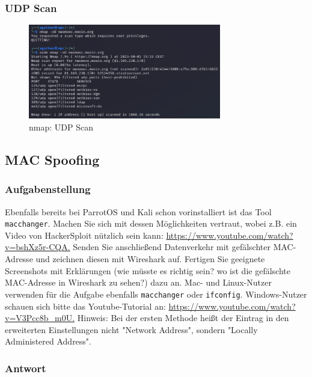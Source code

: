 \documentclass{article}
\begin{document}
\subsubsection*{UDP Scan}

\begin{figure}[H]
	\includegraphics[width=0.75\textwidth]{images/07}
	\centering
	\caption{nmap: UDP Scan}
\end{figure}

\newpage

\subsection{MAC Spoofing}

\subsubsection*{Aufgabenstellung}

Ebenfalls bereits bei ParrotOS und Kali schon vorinstalliert ist das Tool 
\texttt{macchanger}. Machen Sie sich mit dessen Möglichkeiten vertraut, wobei z.B. ein 
Video von HackerSploit nützlich sein kann: \url{https://www.youtube.com/watch?v=bshXz5r-CQA.}
Senden Sie anschließend Datenverkehr mit gefälschter MAC-Adresse und zeichnen diesen mit 
Wireshark auf. Fertigen Sie geeignete Screenshots mit Erklärungen (wie müsste es richtig 
sein? wo ist die gefälschte MAC-Adresse in Wireshark zu sehen?) dazu an.
Mac- und Linux-Nutzer verwenden für die Aufgabe ebenfalls \texttt{macchanger} oder 
\texttt{ifconfig}. Windows-Nutzer schauen sich bitte das Youtube-Tutorial an:
\url{https://www.youtube.com/watch?v=V3Pcc8b_m0U.}
Hinweis: Bei der ersten Methode heißt der Eintrag in den erweiterten Einstellungen nicht
"Network Address", sondern "Locally Administered Address".

\subsubsection*{Antwort}
\end{document}
